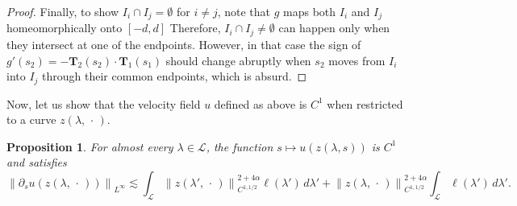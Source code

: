 \documentclass[reqno,centertags,12pt]{amsart}
\newtheorem{proposition}[theorem]{Proposition}
\theoremstyle{definition}
\numberwithin{equation}{section}
\newcommand{\norm}[1]{\left\|#1\right\|}
\begin{document}
\begin{proof}
    Finally, to show $I_{i}\cap I_{j} = \emptyset$ for $i\neq j$, note that
    $g$ maps both $I_{i}$ and $I_{j}$ homeomorphically onto $[-d,d]$
    Therefore, $I_{i}\cap I_{j}\neq\emptyset$ can happen only when they intersect at
    one of the endpoints. However, in that case the sign of
    $g'(s_{2}) = -\mathbf{T}_{2}(s_{2})\cdot\mathbf{T}_{1}(s_{1})$ should change
    abruptly when $s_{2}$ moves from $I_{i}$ into $I_{j}$ through their common endpoints,
    which is absurd.
\end{proof}

Now, let us show that the velocity field $u$
defined as above is $C^{1}$ when restricted to a curve $z(\lambda,\,\cdot\,)$.

\begin{proposition}
    For almost every $\lambda\in\mathcal{L}$, the function
    $s\mapsto u(z(\lambda,s))$ is $C^{1}$ and satisfies
    \[
        \norm{\partial_{s}u(z(\lambda,\,\cdot\,))}_{L^{\infty}}
        \lesssim
        \int_{\mathcal{L}}
        \norm{z(\lambda',\,\cdot\,)}_{C^{1,1/2}}^{2+4\alpha}\ell(\lambda')\,d\lambda'
        + \norm{z(\lambda,\,\cdot\,)}_{C^{1,1/2}}^{2+4\alpha}
        \int_{\mathcal{L}}\ell(\lambda')\,d\lambda'.
    \]
\end{proposition}
\end{document}
